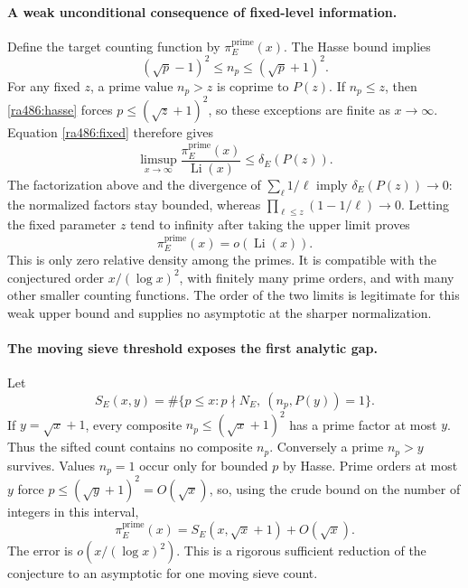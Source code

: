 \documentclass[11pt]{article}
\begin{document}
\paragraph{A weak unconditional consequence of fixed-level information.}
Define the target counting function by $\pi_E^{\mathrm{prime}}(x)$.
The Hasse bound implies
\begin{equation}\label{ra486:hasse}
 (\sqrt p-1)^2\le n_p\le(\sqrt p+1)^2.
\end{equation}
For any fixed $z$, a prime value $n_p>z$ is coprime to $P(z)$.
If $n_p\le z$, then \eqref{ra486:hasse} forces
$p\le(\sqrt z+1)^2$, so these exceptions are finite as $x\to\infty$.
Equation \eqref{ra486:fixed} therefore gives
\[
 \limsup_{x\to\infty}
 \frac{\pi_E^{\mathrm{prime}}(x)}{\operatorname{Li}(x)}
 \le\delta_E(P(z)).
\]
The factorization above and the divergence of $\sum_\ell1/\ell$ imply
$\delta_E(P(z))\to0$: the normalized factors stay bounded, whereas
$\prod_{\ell\le z}(1-1/\ell)\to0$. Letting the fixed parameter $z$
tend to infinity after taking the upper limit proves
\begin{equation}\label{ra486:weak}
 \pi_E^{\mathrm{prime}}(x)=o(\operatorname{Li}(x)).
\end{equation}
This is only zero relative density among the primes. It is compatible
with the conjectured order $x/(\log x)^2$, with finitely many prime
orders, and with many other smaller counting functions. The order of the
two limits is legitimate for this weak upper bound and supplies no
asymptotic at the sharper normalization.

\paragraph{The moving sieve threshold exposes the first analytic gap.}
Let
\[
 S_E(x,y)=\#\{p\le x:p\nmid N_E,\ (n_p,P(y))=1\}.
\]
If $y=\sqrt x+1$, every composite $n_p\le(\sqrt x+1)^2$ has a prime
factor at most $y$. Thus the sifted count contains no composite $n_p$.
Conversely a prime $n_p>y$ survives. Values $n_p=1$ occur only for bounded
$p$ by Hasse. Prime orders at most $y$ force
$p\le(\sqrt y+1)^2=O(\sqrt x)$, so, using the crude bound on the number
of integers in this interval,
\begin{equation}\label{ra486:sievegoal}
 \pi_E^{\mathrm{prime}}(x)=S_E(x,\sqrt x+1)+O(\sqrt x).
\end{equation}
The error is $o(x/(\log x)^2)$. This is a rigorous sufficient reduction
of the conjecture to an asymptotic for one moving sieve count.
\end{document}
